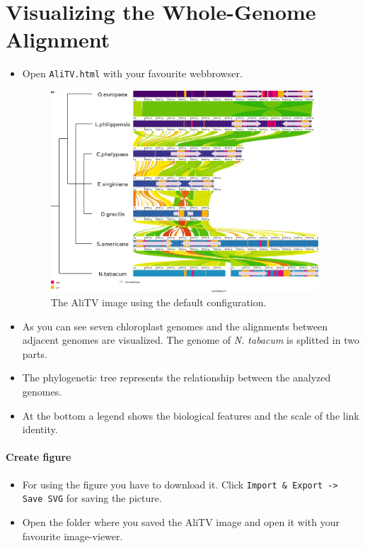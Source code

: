 \documentclass[a4paper]{scrartcl}
\begin{document}
\section*{Visualizing the Whole-Genome Alignment}
\begin{itemize}
	\item Open \texttt{AliTV.html} with your favourite webbrowser.
		
	\begin{figure}[H]
		\centering
		\includegraphics[width=10cm]{showLabels.png}
		\caption{The AliTV image using the default configuration.}
	\end{figure}
	
	\item As you can see seven chloroplast genomes and the alignments between adjacent genomes are visualized. The genome of \textit{N. tabacum} is splitted in two parts. 
	\item The phylogenetic tree represents the relationship between the analyzed genomes.
	\item At the bottom a legend shows the biological features and the scale of the link identity.
\end{itemize}

\paragraph*{Create figure}
\begin{itemize}
	\item For using the figure you have to download it. Click \texttt{Import \& Export -> Save SVG} for saving the picture.
	\item Open the folder where you saved the AliTV image and open it with your favourite image-viewer.
\end{itemize}
\end{document}
